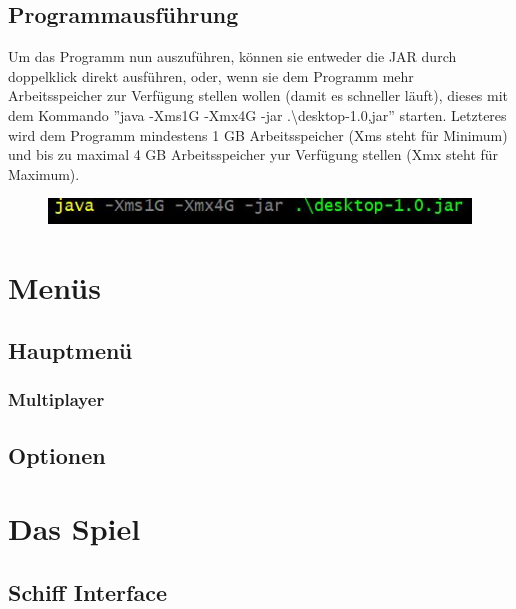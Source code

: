 \documentclass[fontsize=12pt,paper=a4,twoside]{scrartcl}
\begin{document}

\subsection{Programmausführung}

Um das Programm nun auszuführen, können sie entweder die JAR durch doppelklick direkt ausführen, oder, wenn sie dem Programm mehr Arbeitsspeicher zur Verfügung stellen wollen (damit es schneller läuft), dieses mit dem Kommando ''java -Xms1G -Xmx4G -jar .\textbackslash desktop-1.0,jar'' starten. Letzteres wird dem Programm mindestens 1 GB Arbeitsspeicher  (Xms steht für Minimum) und bis zu maximal 4 GB Arbeitsspeicher yur Verfügung stellen (Xmx steht für Maximum).

\begin{figure}[h!]
\centering
\includegraphics[width=0.8\linewidth]{run_application.JPG}
\end{figure} 


\section{Menüs}

\subsection{Hauptmenü}

\subsubsection{Multiplayer}

\subsection{Optionen}


\section{Das Spiel}


\subsection{Schiff Interface}
\end{document}
